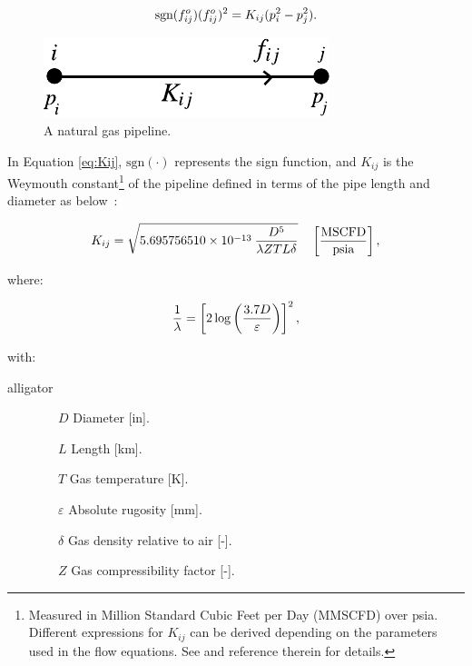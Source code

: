 \begin{equation}
	\label{eq:Weymouth_eq1}
	\text{sgn}(f_{ij}^o)(f_{ij}^o)^2 = K_{ij}(p_i^2-p_j^2). 
	\vspace{0.3cm}
\end{equation}

\begin{figure}[!ht]
	\centering
	\includegraphics[scale=1]{Figures/Pipeline}
	\caption{A natural gas pipeline.}	
	\label{fig:pipeline}
\end{figure}

In Equation \ref{eq:Kij}, $\text{sgn}(\cdot)$ represents the sign function, and $K_{ij}$ is the  Weymouth constant\footnote{Measured in Million Standard Cubic Feet per Day (MMSCFD) over psia. Different expressions for $K_{ij}$ can be derived depending on the parameters used in the flow equations. See \cite{Woldeyohannes2011} and reference therein for details.} of the pipeline defined in terms of the pipe length and diameter as below~\cite{Wolf2000}:

\begin{equation}
	\label{eq:Kij}
	K_{ij} = \sqrt{5.695756510\times 10^{-13}\:\frac{D^5}{\lambda Z T L\delta}}\quad \left[\frac{\text{MSCFD}}{\text{psia}}\right],
	\vspace{0.3cm}
\end{equation}

where: 

\begin{equation}
	\label{eq:lambda_Kij}
	\frac{1}{\lambda} = \left[2\log \left(\frac{3.7D}{\varepsilon}\right)\right]^2,
	\vspace{0.3cm}
\end{equation}

with:

\begin{labeling}{alligator}
	\item [$\qquad \qquad  D$]  \hspace{0.8cm} Diameter [in].
	\item [$\qquad \qquad  L$]  \hspace{0.8cm} Length [km]. 
	\item [$\qquad \qquad  T$] \hspace{0.8cm} Gas temperature [K].
	\item [$\qquad \qquad  \varepsilon$] \hspace{0.8cm} Absolute rugosity [mm].
	\item [$\qquad \qquad  \delta$] \hspace{0.8cm} Gas density relative to air [-].
	\item [$\qquad \qquad  Z$] \hspace{0.8cm} Gas compressibility factor [-].
\end{labeling}

